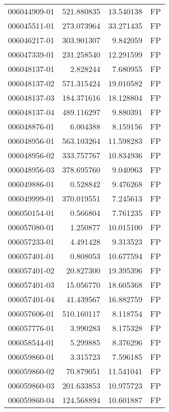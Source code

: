 \begin{tabular}{lrrl}
006044909-01 &  521.880835 &      13.540138 &   FP \\
006045511-01 &  273.073964 &      33.271435 &   FP \\
006046217-01 &  303.901307 &       9.842059 &   FP \\
006047339-01 &  231.258540 &      12.291599 &   FP \\
006048137-01 &    2.828244 &       7.680955 &   FP \\
006048137-02 &  571.315424 &      19.010582 &   FP \\
006048137-03 &  184.371616 &      18.128804 &   FP \\
006048137-04 &  489.116297 &       9.880391 &   FP \\
006048876-01 &    6.004388 &       8.159156 &   FP \\
006048956-01 &  563.103264 &      11.598283 &   FP \\
006048956-02 &  333.757767 &      10.834936 &   FP \\
006048956-03 &  378.695760 &       9.040963 &   FP \\
006049886-01 &    0.528842 &       9.476268 &   FP \\
006049999-01 &  370.019551 &       7.245613 &   FP \\
006050154-01 &    0.566804 &       7.761235 &   FP \\
006057080-01 &    1.250877 &      10.015100 &   FP \\
006057233-01 &    4.491428 &       9.313523 &   FP \\
006057401-01 &    0.808053 &      10.677594 &   FP \\
006057401-02 &   20.827300 &      19.395396 &   FP \\
006057401-03 &   15.056770 &      18.605368 &   FP \\
006057401-04 &   41.439567 &      16.882759 &   FP \\
006057606-01 &  510.160117 &       8.118754 &   FP \\
006057776-01 &    3.990283 &       8.175328 &   FP \\
006058544-01 &    5.299885 &       8.376296 &   FP \\
006059860-01 &    3.315723 &       7.596185 &   FP \\
006059860-02 &   70.879051 &      11.541041 &   FP \\
006059860-03 &  201.633853 &      10.975723 &   FP \\
006059860-04 &  124.568894 &      10.601887 &   FP \\

\end{tabular}
